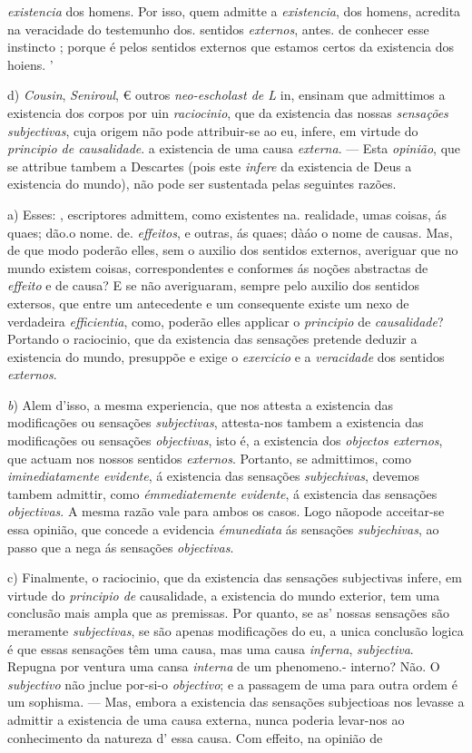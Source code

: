 \emph{existencia} dos homens. Por isso, quem admitte a \emph{existencia}, dos homens, acredita na veracidade do testemunho dos. sentidos \emph{externos}, antes. de conhecer esse instincto ; porque é pelos sentidos externos que estamos certos da existencia dos hoiens. '\par d) \emph{Cousin}, \emph{Seniroul}, € outros \emph{neo-escholast de L} in, ensinam que admittimos a existencia dos corpos por uin \emph{raciocinio}, que da existencia das nossas \emph{sensações subjectivas}, cuja origem não pode attribuir-se ao eu, infere, em virtude do \emph{principio de causalidade}. a existencia de uma causa \emph{externa}. --- Esta \emph{opinião}, que se attribue tambem a Descartes (pois este \emph{infere} da existencia de Deus a existencia do mundo), não pode ser sustentada pelas seguintes razões.\par a) Esses: , escriptores admittem, como existentes na. realidade, umas coisas, ás quaes; dão.o nome. de. \emph{effeitos}, e outras, ás quaes; dàáo o nome de causas. Mas, de que modo poderão elles, sem o auxilio dos sentidos externos, averiguar que no mundo existem coisas, correspondentes e conformes ás noções abstractas de \emph{effeito} e de causa? E se não averiguaram, sempre pelo auxilio dos sentidos extersos, que entre um antecedente e um consequente existe um nexo de verdadeira \emph{efficientia}, como, poderão elles applicar o \emph{principio} de \emph{causalidade}? Portando o raciocinio, que da existencia das sensações pretende deduzir a existencia do mundo, presuppõe e exige o \emph{exercicio} e a \emph{veracidade} dos sentidos \emph{externos}.\par \emph{b}) Alem d'isso, a mesma experiencia, que nos attesta a existencia das modificações ou sensações \emph{subjectivas}, attesta-nos tambem a existencia das modificações ou sensações \emph{objectivas}, isto é, a existencia dos \emph{objectos externos}, que actuam nos nossos sentidos \emph{externos}. Portanto, se admittimos, como \emph{iminediatamente evidente}, á existencia das sensações \emph{subjechivas}, devemos tambem admittir, como \emph{émmediatemente evidente}, á existencia das sensações \emph{objectivas}. A mesma razão vale para ambos os casos. Logo nãopode acceitar-se essa opinião, que concede a evidencia \emph{émunediata} ás sensações \emph{subjechivas}, ao passo que a nega ás sensações \emph{objectivas}.\par c) Finalmente, o raciocinio, que da existencia das sensações subjectivas infere, em virtude do \emph{principio de} causalidade, a existencia do mundo exterior, tem uma conclusão mais ampla que as premissas. Por quanto, se as' nossas sensações são meramente \emph{subjectivas}, se são apenas modificações do eu, a unica conclusão logica é que essas sensações têm uma causa, mas uma causa \emph{inferna}, \emph{subjectiva}. Repugna por ventura uma cansa \emph{interna} de um phenomeno.- interno? Não. O \emph{subjectivo} não jnclue por-si-o \emph{objectivo}; e a passagem de uma para outra ordem é um sophisma. --- Mas, embora a existencia das sensações subjectioas nos levasse a admittir a existencia de uma causa externa, nunca poderia levar-nos ao conhecimento da natureza d' essa causa. Com effeito, na opinião de 